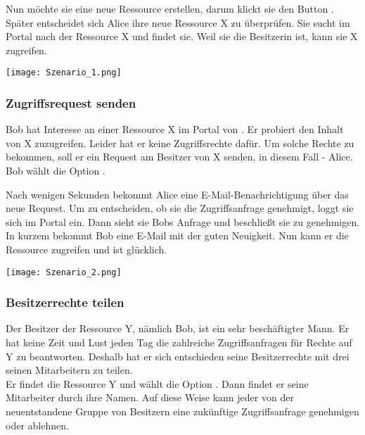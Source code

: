 \documentclass[parskip=full,11pt]{scrartcl}
\begin{document}
Nun möchte sie eine neue Ressource erstellen, darum klickt sie den Button \grqq. Später entscheidet sich Alice ihre neue Ressource X zu überprüfen. Sie sucht im Portal nach der Ressource X und findet sie. Weil sie die Besitzerin ist, kann sie X zugreifen.\\

	\begin{center}
	\texttt{[image: Szenario\_1.png]}
	\end{center}
\newpage
\subsubsection*{Zugriffsrequest senden}
Bob hat Interesse an einer Ressource X im Portal von \grqq. Er probiert den Inhalt von X zuzugreifen. Leider hat er keine Zugriffsrechte dafür. Um solche Rechte zu bekommen, soll er ein Request am Besitzer von X senden, in diesem Fall - Alice. Bob wählt die Option \grqq. 

Nach wenigen Sekunden bekommt Alice eine E-Mail-Benachrichtigung über das neue Request. Um zu entscheiden, ob sie die Zugriffsanfrage genehmigt, loggt sie sich im Portal ein. Dann sieht sie Bobs Anfrage und beschließt sie zu genehmigen. In kurzem bekommt Bob eine E-Mail mit der guten Neuigkeit. Nun kann er die Ressource zugreifen und ist glücklich.\\
	
	\begin{center}
	\texttt{[image: Szenario\_2.png]}
	\end{center}

\newpage
\subsubsection*{Besitzerrechte teilen}
Der Besitzer der Ressource Y, nämlich Bob, ist ein sehr beschäftigter Mann. Er hat keine Zeit und Lust jeden Tag die zahlreiche Zugriffsanfragen für Rechte auf Y zu beantworten. Deshalb hat er sich entschieden seine Besitzerrechte mit drei seinen Mitarbeitern zu teilen. \\
Er findet die Ressource Y und wählt die Option \grqq. Dann findet er seine Mitarbeiter durch ihre Namen. Auf diese Weise kann jeder von der neuentstandene Gruppe von Besitzern eine zukünftige Zugriffsanfrage genehmigen oder ablehnen.\\
\end{document}
